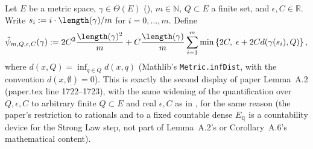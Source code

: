 \begin{definition}
  Let $E$ be a metric space, $\gamma \in \Theta(E)$ (), $m \in \mathbb{N}$,
  $Q \subset E$ a finite set, and $\epsilon, C \in \mathbb{R}$. Write $s_i := i \cdot
  \length(\gamma)/m$ for $i = 0,\dotsc,m$. Define
  \[
    \tilde\psi_{m,Q,\epsilon,C}(\gamma) := 2C^2\frac{\length(\gamma)^2}{m}
      + C\frac{\length(\gamma)}{m} \sum_{i=1}^m \min\left\{2C,\; \epsilon+
        2Cd(\gamma(s_i),Q)\right\}
    ,
  \]
  where $d(x,Q) = \inf_{q \in Q} d(x,q)$ (Mathlib's \texttt{Metric.infDist}, with the convention
  $d(x,\emptyset) = 0$). This is exactly the second display of paper Lemma~A.2 (paper.tex line
  1722--1723), with the same widening of the quantification over $Q,\epsilon,C$ to arbitrary finite
  $Q \subset E$ and real $\epsilon, C$ as in , for the same reason (the paper's
  restriction to rationals and to a fixed countable dense $E_{\mathbb{Q}}$ is a countability device
  for the Strong Law step, not part of Lemma~A.2's or Corollary~A.6's mathematical content).
\end{definition}
